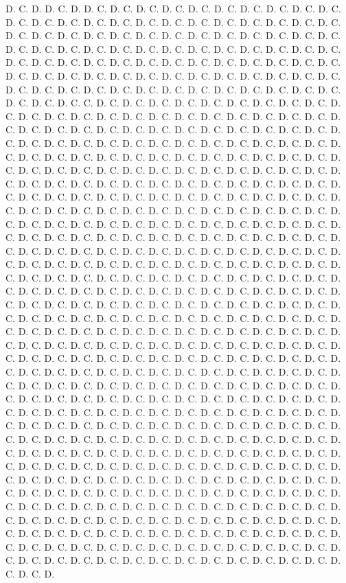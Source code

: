 \documentclass[12pt, a4paper]{report}
\begin{document}
\begin{thebibliography}{99}
     D. C. D. D. C. D. D. C. D. C. D. C. D. C. D. C. D. C. D. C. D. C. D. C. D. C. D. C. D. C. D. C. D. C. D. C. D. C. D. C. D. C. D. C. D. C. D. C. D. C. D. C. D. C. D. C. D. C. D. C. D. C. D. C. D. C. D. C. D. C. D. C. D. C. D. C. D. C. D. C. D. C. D. C. D. C. D. C. D. C. D. C. D. C. D. C. D. C. D. C. D. C. D. C. D. C. D. C. D. C. D. C. D. C. D. C. D. C. D. C. D. C. D. C. D. C. D. C. D. C. D. C. D. C. D. C. D. C. D. C. D. C. D. C. D. C. D. C. D. C. D. C. D. C. D. C. D. C. D. C. D. C. D. C. D. C. D. C. D. C. D. C. D. C. D. C. D. C. D. C. D. C. D. C. D. C. D. C. C. D. C. D. C. D. C. D. C. D. C. D. C. D. C. D. C. D. C. D. C. D. C. D. C. D. C. D. C. D. C. D. C. D. C. D. C. D. C. D. C. D. C. D. C. D. C. D. C. D. C. D. C. D. C. D. C. D. C. D. C. D. C. D. C. D. C. D. C. D. C. D. C. D. C. D. C. D. C. D. C. D. C. D. C. D. C. D. C. D. C. D. C. D. C. D. C. D. C. D. C. D. C. D. C. D. C. D. C. D. C. D. C. D. C. D. C. D. C. D. C. D. C. D. C. D. C. D. C. D. C. D. C. D. C. D. C. D. C. D. C. D. C. D. C. D. C. D. C. D. C. D. C. D. C. D. C. D. C. D. C. D. C. D. C. D. C. D. C. D. C. D. C. D. C. D. C. D. C. D. C. D. C. D. C. D. C. D. C. D. C. D. C. D. C. D. C. D. C. D. C. D. C. D. C. D. C. D. C. D. C. D. C. D. C. D. C. D. C. D. C. D. C. D. C. D. C. D. C. D. C. D. C. D. C. D. C. D. C. D. C. D. C. D. C. D. C. D. C. D. C. D. C. D. C. D. C. D. C. D. C. D. C. D. C. D. C. D. C. D. C. D. C. D. C. D. C. D. C. D. C. D. C. D. C. D. C. D. C. D. C. D. C. D. C. D. C. D. C. D. C. D. C. D. C. D. C. D. C. D. C. D. C. D. C. D. C. D. C. D. C. D. C. D. C. D. C. D. C. D. C. D. C. D. C. D. C. D. C. D. C. D. C. D. C. D. C. D. C. D. C. D. C. D. C. D. C. D. C. D. C. D. C. D. C. D. C. D. C. D. C. D. C. D. C. D. C. D. C. D. C. D. C. D. C. D. C. D. C. D. C. D. C. D. C. D. C. D. C. D. C. D. C. D. C. D. C. D. C. D. C. D. C. D. C. D. C. D. C. D. C. D. C. D. C. D. C. D. C. D. C. D. C. D. C. D. C. D. C. D. C. D. C. D. C. D. C. D. C. D. C. D. C. D. C. D. C. D. C. D. C. D. C. D. C. D. C. D. C. D. C. D. C. D. C. D. C. D. C. D. C. D. C. D. C. D. C. D. C. D. C. D. C. D. C. D. C. D. C. D. C. D. C. D. C. D. C. D. C. D. C. D. C. D. C. D. C. D. C. D. C. D. C. D. C. D. C. D. C. D. C. D. C. D. C. D. C. D. C. D. C. D. C. D. C. D. C. D. C. D. C. D. C. D. C. D. C. D. C. D. C. D. C. D. C. D. C. D. C. D. C. D. C. D. C. D. C. D. C. D. C. D. C. D. C. D. C. D. C. D. C. D. C. D. C. D. C. D. C. D. C. D. C. D. C. D. C. D. C. D. C. D. C. D. C. D. C. D. C. D. C. D. C. D. C. D. C. D. C. D. C. D. C. D. C. D. C. D. C. D. C. D. C. D. C. D. C. D. C. D. C. D. C. D. C. D. C. D. C. D. C. D. C. D. C. D. C. D. C. D. C. D. C. D. C. D. C. D. C. D. C. D. C. D. C. D. C. D. C. D. C. D. C. D. C. D. C. D. C. D. C. D. C. D. C. D. C. D. C. D. C. D. C. D. C. D. C. D. C. D. C. D. C. D. C. D. C. D. C. D. C. D. C. D. C. D. C. D. C. D. C. D. C. D. C. D. C. D. C. D. C. D. C. D. C. D. C. D. C. D. C. D. C. D. C. D. C. D. C. D. C. D. C. D. C. D. C. D. C. D. C. D. C. D. C. D. C. D. C. D. C. D. C. D. C. D. C. D. C. D. C. D. C. D. C. D. C. D. C. D. C. D. C. D. C. D. C. D. C. D. C. D. C. D. C. D. C. D. C. D. C. D. C. D. C. D. C. D. C. D. C. D. C. D. C. D. C. D. C. D. C. D. C. D. C. D. C. D. C. D. C. D. C. D. C. D. C. D. C. D. C. D. C. D. C. D. C. D. C. D. C. D. C. D. C. D. C. D. C. D. C. D. C. D. C. D. C. D. C. D. C. D. C. D. C. D. C. D. 
\end{thebibliography}
\end{document}
